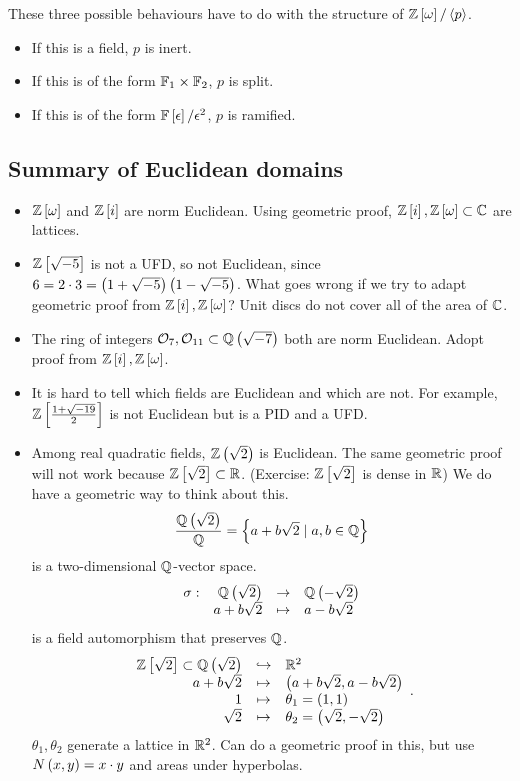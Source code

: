 \begin{remark*}
These three possible behaviours have to do with the structure of $ \mathbb{Z}\left[ \omega \right] / \left\langle p \right\rangle $.
\begin{itemize}
\item If this is a field, $ p $ is inert.
\item If this is of the form $ \mathbb{F}_1 \times \mathbb{F}_2 $, $ p $ is split.
\item If this is of the form $ \mathbb{F}\left[ \epsilon \right] / \epsilon^2 $, $ p $ is ramified.
\end{itemize}
\end{remark*}

\pagebreak

\subsection{Summary of Euclidean domains}

\begin{itemize}
\item $ \mathbb{Z}\left[ \omega \right] $ and $ \mathbb{Z}\left[ i \right] $ are norm Euclidean. Using geometric proof, $ \mathbb{Z}\left[ i \right], \mathbb{Z}\left[ \omega \right] \subset \mathbb{C} $ are lattices.
\item $ \mathbb{Z}\left[ \sqrt{-5} \right] $ is not a UFD, so not Euclidean, since $ 6 = 2 \cdot 3 = \left( 1 + \sqrt{-5} \right)\left( 1 - \sqrt{-5} \right) $. What goes wrong if we try to adapt geometric proof from $ \mathbb{Z}\left[ i \right], \mathbb{Z}\left[ \omega \right] $? Unit discs do not cover all of the area of $ \mathbb{C} $.
\item The ring of integers $ \mathcal{O}_7, \mathcal{O}_{11} \subset \mathbb{Q}\left( \sqrt{-7} \right) $ both are norm Euclidean. Adopt proof from $ \mathbb{Z}\left[ i \right], \mathbb{Z}\left[ \omega \right] $.
\item It is hard to tell which fields are Euclidean and which are not. For example, $ \mathbb{Z}\left[ \tfrac{1 + \sqrt{-19}}{2} \right] $ is not Euclidean but is a PID and a UFD.
\item Among real quadratic fields, $ \mathbb{Z}\left( \sqrt{2} \right) $ is Euclidean. The same geometric proof will not work because $ \mathbb{Z}\left[ \sqrt{2} \right] \subset \mathbb{R} $. (Exercise: $ \mathbb{Z}\left[ \sqrt{2} \right] $ is dense in $ \mathbb{R} $) We do have a geometric way to think about this.
$$ \dfrac{\mathbb{Q}\left( \sqrt{2} \right)}{\mathbb{Q}} = \left\{ a + b\sqrt{2} \mid a, b \in \mathbb{Q} \right\} $$
is a two-dimensional $ \mathbb{Q} $-vector space.
$$ \function[\sigma]{\Q\rb{\sqrt{2}}}{\Q\rb{-\sqrt{2}}}{a + b\sqrt{2}}{a - b\sqrt{2}} $$
is a field automorphism that preserves $ \mathbb{Q} $.
$$
\begin{array}{rcl}
\mathbb{Z}\left[ \sqrt{2} \right] \subset \mathbb{Q}\left( \sqrt{2} \right) & \hookrightarrow & \mathbb{R}^2 \\
a + b\sqrt{2} & \mapsto & \left( a + b\sqrt{2}, a - b\sqrt{2} \right) \\
1 & \mapsto & \theta_1 = \left( 1, 1 \right) \\
\sqrt{2} & \mapsto & \theta_2 = \left( \sqrt{2}, -\sqrt{2} \right)
\end{array}.
$$
$ \theta_1, \theta_2 $ generate a lattice in $ \mathbb{R}^2 $. Can do a geometric proof in this, but use $ N\left( x, y \right) = x \cdot y $ and areas under hyperbolas.
\end{itemize}


